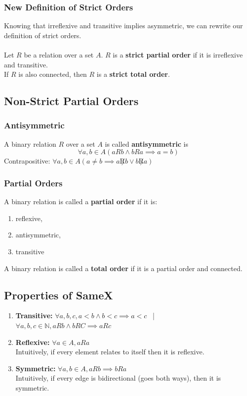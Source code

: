 \documentclass{article}
\begin{document}
\subsubsection{New Definition of Strict Orders}
Knowing that irreflexive and transitive implies asymmetric, we can rewrite our definition of strict orders.\\\\
Let $R$ be a relation over a set $A$. $R$ is a \textbf{strict partial order} if it is irreflexive and transitive.\\
If $R$ is also connected, then $R$ is a \textbf{strict total order}.

\subsection{Non-Strict Partial Orders}
\subsubsection{Antisymmetric}
A binary relation $R$ over a set $A$ is called \textbf{antisymmetric} is 
$$\forall a,b \in A (aRb \land bRa \implies a = b)$$
Contrapositive: $\forall a,b \in A (a \neq b \implies a\not R b \lor b\not R a)$

\subsubsection{Partial Orders}
A binary relation is called a \textbf{partial order} if it is:
\begin{enumerate}
    \item reflexive,
    \item antisymmetric,
    \item transitive
\end{enumerate}
A binary relation is called a \textbf{total order} if it is a partial order and connected.
\subsection{Properties of SameX}
\begin{enumerate}
    \item \textbf{Transitive: }$\forall a,b,c, a < b \land b < c \implies a < c$ \ | \ $\forall a,b, c \in \mathbb{N}, aRb \land bRC \implies aRc$
    \item \textbf{Reflexive: }$\forall a \in A, aRa$\\
    Intuitively, if every element relates to itself then it is reflexive.
    \item \textbf{Symmetric: }$\forall a,b \in A, aRb \implies bRa$\\
    Intuitively, if every edge is bidirectional (goes both ways), then it is symmetric.
\end{enumerate}
\end{document}
